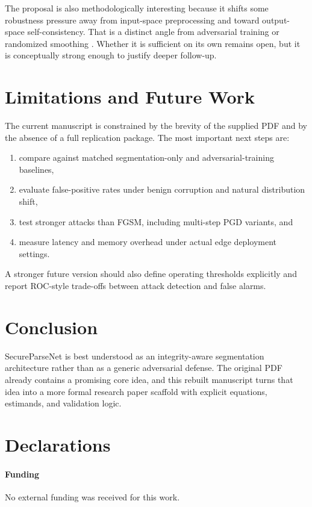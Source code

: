 \documentclass[11pt]{article}
\begin{document}
The proposal is also methodologically interesting because it shifts some robustness pressure away from input-space preprocessing and toward output-space self-consistency. That is a distinct angle from adversarial training or randomized smoothing \citep{madry2018towards,cohen2019randomized}. Whether it is sufficient on its own remains open, but it is conceptually strong enough to justify deeper follow-up.

\section{Limitations and Future Work}
The current manuscript is constrained by the brevity of the supplied PDF and by the absence of a full replication package. The most important next steps are:
\begin{enumerate}[leftmargin=*]
\item compare against matched segmentation-only and adversarial-training baselines,
\item evaluate false-positive rates under benign corruption and natural distribution shift,
\item test stronger attacks than FGSM, including multi-step PGD variants, and
\item measure latency and memory overhead under actual edge deployment settings.
\end{enumerate}

A stronger future version should also define operating thresholds explicitly and report ROC-style trade-offs between attack detection and false alarms.

\section{Conclusion}
SecureParseNet is best understood as an integrity-aware segmentation architecture rather than as a generic adversarial defense. The original PDF already contains a promising core idea, and this rebuilt manuscript turns that idea into a more formal research paper scaffold with explicit equations, estimands, and validation logic.

\section*{Declarations}
\paragraph{Funding} No external funding was received for this work.
\end{document}
